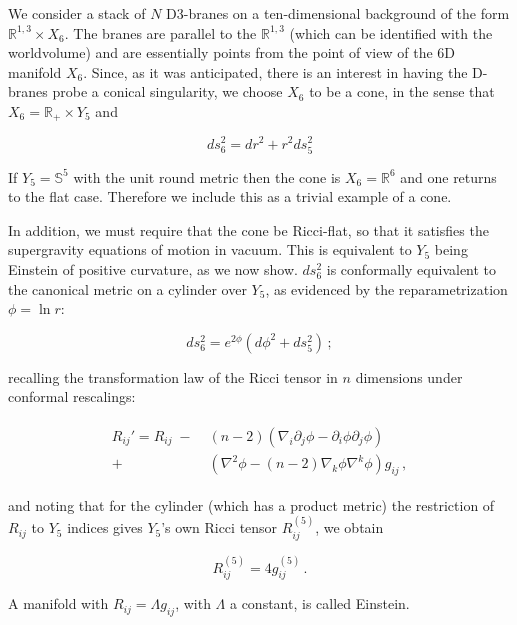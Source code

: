 We consider a stack of $N$ D3-branes on a ten-dimensional background of the form $\mathbb{R}^{1,3} \times X_6$. The branes are parallel to the $\mathbb{R}^{1,3}$ (which can be identified with the worldvolume) and are essentially points from the point of view of the 6D manifold $X_6$. Since, as it was anticipated, there is an interest in having the D-branes probe a conical singularity, we choose $X_6$ to be a cone, in the sense that $X_6 = \mathbb{R}_+ \times Y_5$ and

\begin{equation}
	ds_6^2 = dr^2 + r^2 ds_5^2
	\label{}
\end{equation}

If $Y_5 = \mathbb{S}^5$ with the unit round metric then the cone is $X_6 = \mathbb{R}^6$ and one returns to the flat case. Therefore we include this as a trivial example of a cone.

In addition, we must require that the cone be Ricci-flat, so that it satisfies the supergravity equations of motion in vacuum. This is equivalent to $Y_5$ being Einstein of positive curvature, as we now show. $ds_6^2$ is conformally equivalent to the canonical metric on a cylinder over $Y_5$, as evidenced by the reparametrization $\phi = \ln r$:

\begin{equation}
	ds_6^2 = e^{2\phi} \left( d\phi^2 + ds_5^2 \right)\,;
\end{equation}

recalling the transformation law of the Ricci tensor in $n$ dimensions under conformal rescalings:

\begin{align}
	\begin{split}
	R_{ij}' = R_{ij} \; - &\; (n-2)\left( \nabla_i \partial_j \phi - \partial_i \phi \partial_j \phi \right) \\+ &\; \left( \nabla^2 \phi - (n-2) \nabla_k \phi \nabla^k \phi \right) g_{ij}\,,
\end{split}
\end{align}

and noting that for the cylinder (which has a product metric) the restriction of $R_{ij}$ to $Y_5$ indices gives $Y_5$'s own Ricci tensor $R_{ij}^{(5)}$, we obtain

\begin{equation}
	R^{(5)}_{ij} = 4 g_{ij}^{(5)}\,.
\end{equation}

A manifold with $R_{ij} = \Lambda g_{ij}$, with $\Lambda$ a constant, is called Einstein.

